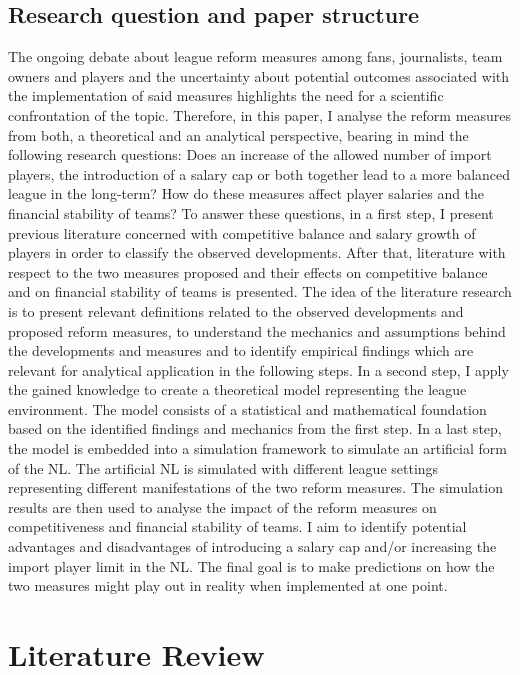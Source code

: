 \documentclass[12pt, a4paper]{article}
\begin{document}
\subsection{Research question and paper structure}

The ongoing debate about league reform measures among fans, journalists, team owners and players and the uncertainty about potential outcomes associated with the implementation of said measures highlights the need for a scientific confrontation of the topic. Therefore, in this paper, I analyse the reform measures from both, a theoretical and an analytical perspective, bearing in mind the following research questions: Does an increase of the allowed number of import players, the introduction of a salary cap or both together lead to a more balanced league in the long-term? How do these measures affect player salaries and the financial stability of teams? To answer these questions, in a first step, I present previous literature concerned with competitive balance and salary growth of players in order to classify the observed developments. After that, literature with respect to the two measures proposed and their effects on competitive balance and on financial stability of teams is presented. The idea of the literature research is to present relevant definitions related to the observed developments and proposed reform measures, to understand the mechanics and assumptions behind the developments and measures and to identify empirical findings which are relevant for analytical application in the following steps. In a second step, I apply the gained knowledge to create a theoretical model representing the league environment. The model consists of a statistical and mathematical foundation based on the identified findings and mechanics from the first step. In a last step, the model is embedded into a simulation framework to simulate an artificial form of the NL. The artificial NL is simulated with different league settings representing different manifestations of the two reform measures. The simulation results are then used to analyse the impact of the reform measures on competitiveness and financial stability of teams. I aim to identify potential advantages and disadvantages of introducing a salary cap and/or increasing the import player limit in the NL. The final goal is to make predictions on how the two measures might play out in reality when implemented at one point. 

\section{Literature Review}
\end{document}
